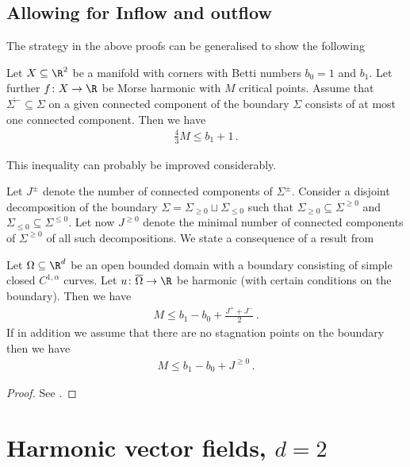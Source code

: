 \section{Allowing for Inflow and outflow}

The strategy in the above proofs can be generalised to show the following
\begin{conjecture}
  Let $X\subseteq\R^2$ be a manifold with corners with Betti numbers $b_0=1$ and $b_1$.
  Let further $f\colon X\to\R$ be Morse harmonic with $M$ critical points.
  Assume that 
  $\overline{\Sigma^-}\subseteq\Sigma$ on a given connected component 
  of the boundary $\Sigma$
  consists of at most one connected component. Then we have
  \begin{align*}
    \frac{4}{3}M\leq b_1+1\,.
  \end{align*}
\end{conjecture}
This inequality can probably be improved considerably.

Let $J^\pm$ denote the number of connected components of $\Sigma^\pm$.
Consider a disjoint decomposition of the boundary $\Sigma=\Sigma_{\geq0}\sqcup\Sigma_{\leq0}$ such
that $\Sigma_{\geq0}\subseteq\Sigma^{\geq0}$ and $\Sigma_{\leq0}\subseteq\Sigma^{\leq0}$.
Let now $J^{\geq0}$ denote the minimal number of connected components of $\Sigma^{\geq0}$ of all such
decompositions.
We state a consequence of a result from \cite[Theorem 2.1]{Alessandrini1992}
\begin{proposition} 
  Let $\Omega\subseteq\R^d$ be an open bounded domain with a boundary consisting of simple closed $C^{1,\alpha}$ curves.
  Let $u\colon \overline{\Omega}\to \R$ be harmonic (with certain conditions on the boundary).
  Then we have
  \begin{align*}
    M\leq b_1-b_0+\frac{J^++J^-}{2}\,.
  \end{align*}
  If in addition we assume that there are no stagnation points on the boundary then we have
  \begin{align*}
    M\leq b_1-b_0+J^{\geq0}\,.
  \end{align*}
\end{proposition}
\begin{proof}
  See \cite[Theorem 2.1]{Alessandrini1992}.
\end{proof}

\newpage

\chapter{Harmonic vector fields, $d=2$}


